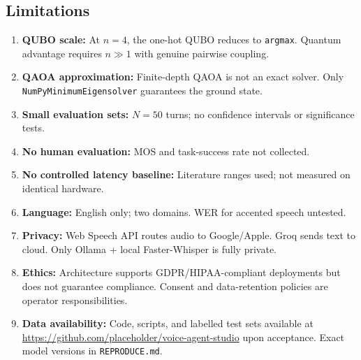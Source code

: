 \documentclass[11pt,a4paper]{article}
\begin{document}
\subsection{Limitations}
\label{subsec:limitations}

\begin{enumerate}[leftmargin=*]
    \item \textbf{QUBO scale:} At $n{=}4$, the one-hot QUBO reduces to \texttt{argmax}. Quantum advantage requires $n{\gg}1$ with genuine pairwise coupling.
    \item \textbf{QAOA approximation:} Finite-depth QAOA is not an exact solver. Only \texttt{NumPyMinimumEigensolver} guarantees the ground state.
    \item \textbf{Small evaluation sets:} $N{=}50$ turns; no confidence intervals or significance tests.
    \item \textbf{No human evaluation:} MOS and task-success rate not collected.
    \item \textbf{No controlled latency baseline:} Literature ranges used; not measured on identical hardware.
    \item \textbf{Language:} English only; two domains. WER for accented speech untested.
    \item \textbf{Privacy:} Web Speech API routes audio to Google/Apple. Groq sends text to cloud. Only Ollama + local Faster-Whisper is fully private.
    \item \textbf{Ethics:} Architecture supports GDPR/HIPAA-compliant deployments but does not guarantee compliance. Consent and data-retention policies are operator responsibilities.
    \item \textbf{Data availability:} Code, scripts, and labelled test sets available at \url{https://github.com/placeholder/voice-agent-studio} upon acceptance. Exact model versions in \texttt{REPRODUCE.md}.
\end{enumerate}
\end{document}
